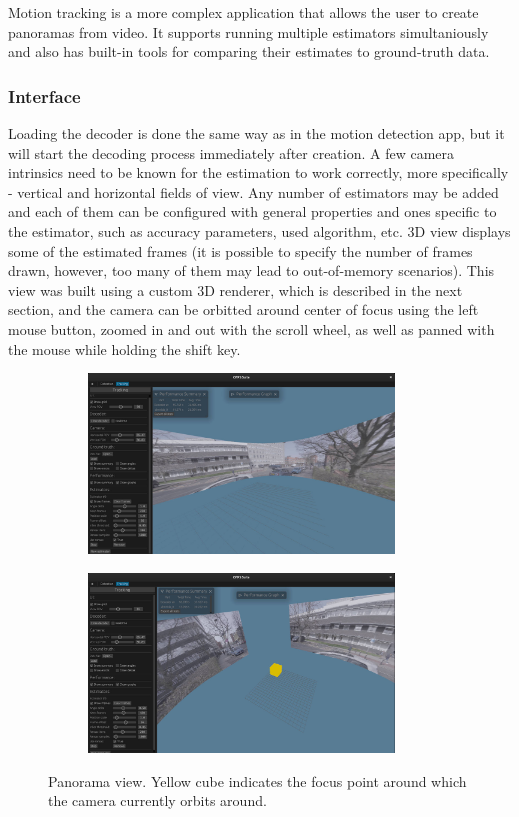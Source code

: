 \documentclass[11pt,english]{report}
\begin{document}
Motion tracking is a more complex application that allows the user to create panoramas from video. It supports running multiple estimators simultaniously and also has built-in tools for comparing their estimates to ground-truth data.

\subsubsection{Interface}

Loading the decoder is done the same way as in the motion detection app, but it will start the decoding process immediately after creation. A few camera intrinsics need to be known for the estimation to work correctly, more specifically - vertical and horizontal fields of view. Any number of estimators may be added and each of them can be configured with general properties and ones specific to the estimator, such as accuracy parameters, used algorithm, etc. 3D view displays some of the estimated frames (it is possible to specify the number of frames drawn, however, too many of them may lead to out-of-memory scenarios). This view was built using a custom 3D renderer, which is described in the next section, and the camera can be orbitted around center of focus using the left mouse button, zoomed in and out with the scroll wheel, as well as panned with the mouse while holding the shift key.

\begin{figure}[!ht]
	\centering
	\centering
	\begin{subfigure}{230pt}
		\includegraphics[width=230pt]{docs/report/panorama2.jpg}
	\end{subfigure}
	\begin{subfigure}{230pt}
		\includegraphics[width=230pt]{docs/report/panorama.jpg}
	\end{subfigure}
	\caption{\centering Panorama view. Yellow cube indicates the focus point around which the camera currently orbits around.}
\end{figure}
\end{document}

